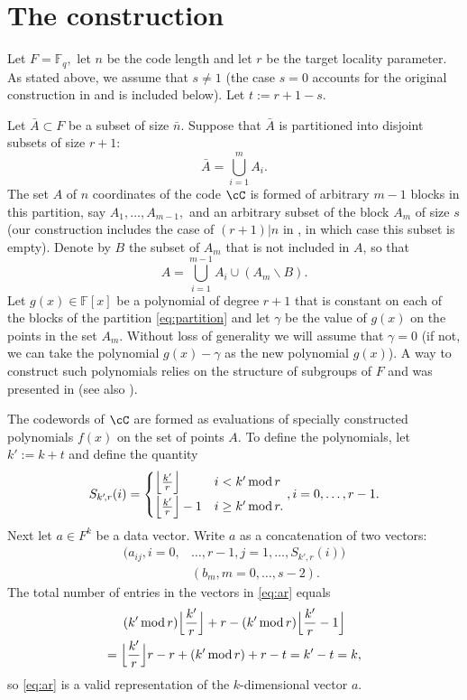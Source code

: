 \documentclass{IEEEtran}
\newcounter{construction}[section]
\newcommand{\Mod}[1]{\,\textup{mod}\,#1}
\begin{document}
\section{The construction}
Let $F=\mathbb{F}_q,$ let $n$ be the code length and let $r$ be the target locality parameter. 
As stated above, we assume that $s\ne 1$ 
(the case $s=0$ accounts for the original construction in \cite{OptimalLRC} and is included below).
Let $t:=r+1-s.$

Let $\bar A\subset F$ be a subset of size $\bar n.$ Suppose that $\bar A$ is partitioned into disjoint
subsets of size $r+1$:
  \begin{equation}\label{eq:partition}
   \bar A=\bigcup_{i=1}^{m}{A_i}.
 \end{equation}
The set $A$ of $n$ coordinates of the code $\cC$ is formed of arbitrary $m-1$ blocks in this partition, say
$A_1,\dots,A_{m-1},$ and an arbitrary subset of the block $A_{m}$ of size $s$ (our construction includes the case of $(r+1)|n$ in \cite{OptimalLRC}, in which case this subset is empty). Denote by $B$ the subset
of $A_{m}$ that is not included in $A$, so that 
  $$
  A=\bigcup_{i=1}^{m-1}{A_i}\cup (A_{m}\backslash B).
  $$
Let $g(x)\in \mathbb{F}[x]$ be a polynomial of degree $r+1$ that is constant on each of the blocks of the partition \eqref{eq:partition} and let $\gamma$ be the value of $g(x)$ on the points in the set $A_{m}$. Without loss of generality we will assume that $\gamma=0$ (if not, we can take the polynomial $g(x)-\gamma$ as the new polynomial $g(x)$). A way to construct such
polynomials relies on the structure of subgroups of $F$ and was presented in \cite{OptimalLRC} (see also \cite{LiuMesnagerChen18}).

The codewords of $\cC$ are formed as evaluations of specially constructed polynomials $f(x)$ on the set of points $A.$
To define the polynomials, let $k':=k+t$ and define the quantity
   $$
   S_{k'\!,r}(i)=
\begin{cases}
\Big\lfloor \frac{k'}{r}\Big\rfloor & i<k' \Mod r \\[.05in]
\Big\lfloor \frac{k'}{r}\Big\rfloor-1 & i\geq k' \Mod r.
\end{cases}, i=0,\dots,r-1.
  $$
 Next let $a\in F^k$ be a data vector. Write $a$ as a concatenation of two vectors:
   \begin{equation}\label{eq:ar}
  \begin{aligned}
   (a_{ij},i=0,&\dots,r-1,j=1,\dots,S_{k'\!,r}(i))\\
   &(b_m,m=0,\dots,s-2).
   \end{aligned}
   \end{equation}
The total number of entries in the vectors in \eqref{eq:ar} equals
  \begin{multline*}
  (k' \Mod r)\Big\lfloor \frac{k'}{r}\Big\rfloor + r-(k' \Mod r)\Big\lfloor \frac{k'}{r} - 1\Big\rfloor  \\ = \Big\lfloor \frac{k'}{r}\Big\rfloor r - r + (k' \Mod r) +r -t = k' - t = k,
  \end{multline*}
so \eqref{eq:ar} is a valid representation of the $k$-dimensional vector $a.$
\end{document}

